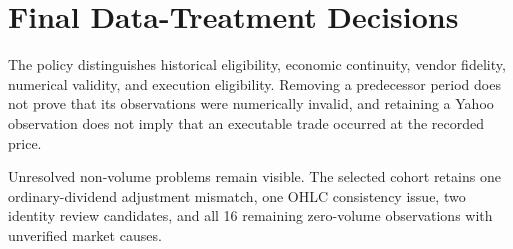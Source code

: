 \section{Final Data-Treatment Decisions}

The policy distinguishes historical eligibility, economic continuity, vendor
fidelity, numerical validity, and execution eligibility. Removing a predecessor
period does not prove that its observations were numerically invalid, and
retaining a Yahoo observation does not imply that an executable trade occurred
at the recorded price.

\begin{table}[H]
\centering
\caption{Final cleaning and retention decisions}
\label{tab:treatments}
\small
{}
\end{table}

Unresolved non-volume problems remain visible. The selected cohort retains one
ordinary-dividend adjustment mismatch, one OHLC consistency issue, two identity
review candidates, and all 16 remaining zero-volume observations with
unverified market causes.
